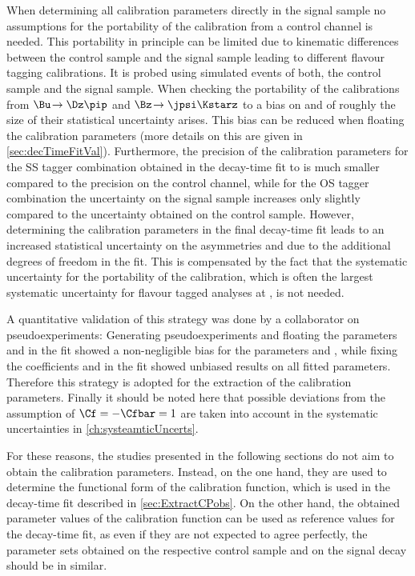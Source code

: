 When determining all calibration parameters directly in the signal sample no assumptions for the portability of the calibration from a control channel is needed.
This portability in principle can be limited due to kinematic differences between the control sample and the signal sample leading to different flavour tagging calibrations.
It is probed using simulated events of both, the control sample and the signal sample.
When checking the portability of the calibrations from $\Bu\!\to\Dz\pip$ and $\Bz\!\to\jpsi\Kstarz$ to \BdToDpi a bias on \Sf and \Sfbar of roughly the size of their statistical uncertainty arises.
This bias can be reduced when floating the calibration parameters (more details on this are given in \cref{sec:decTimeFitVal}).
Furthermore, the precision of the calibration parameters for the SS tagger combination obtained in the decay-time fit to \mbox{\BdToDpi} is much smaller compared to the precision on the control channel, while for the OS tagger combination the uncertainty on the signal sample increases only slightly compared to the uncertainty obtained on the control sample.
However, determining the calibration parameters in the final decay-time fit leads to an increased statistical uncertainty on the \CP asymmetries \Sf and \Sfbar due to the additional degrees of freedom in the fit.
This is compensated by the fact that the systematic uncertainty for the portability of the calibration, which is often the largest systematic uncertainty for flavour tagged analyses at \lhcb, is not needed.

A quantitative validation of this strategy was done by a collaborator on pseudoexperiments:
Generating pseudoexperiments and floating the parameters \Cf and \Cfbar in the fit showed a non-negligible bias for the parameters \Sf and \Sfbar, while fixing the coefficients \Cf and \Cfbar in the fit showed unbiased results on all fitted parameters.
Therefore this strategy is adopted for the extraction of the calibration parameters.
Finally it should be noted here that possible deviations from the assumption of $\Cf=-\Cfbar=1$ are taken into account in the systematic uncertainties in \cref{ch:systeamticUncerts}.

For these reasons, the studies presented in the following sections do not aim to obtain the calibration parameters.
Instead, on the one hand, they are used to determine the functional form of the calibration function, which is used in the decay-time fit described in \cref{sec:ExtractCPobs}.
On the other hand, the obtained parameter values of the calibration function can be used as reference values for the decay-time fit, as even if they are not expected to agree perfectly, the parameter sets obtained on the respective control sample and on the signal decay should be in similar.

